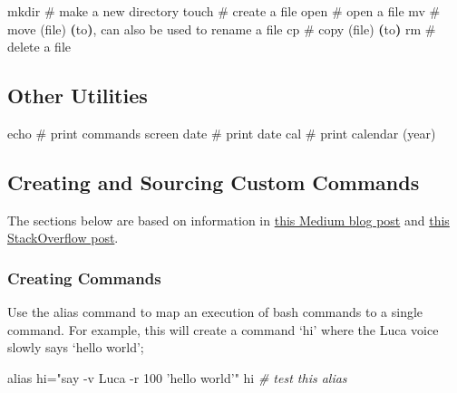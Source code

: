 \documentclass[]{article}
\newenvironment{Shaded}{\begin{snugshade}}{\end{snugshade}}
\newcommand{\KeywordTok}[1]{\textcolor[rgb]{0.13,0.29,0.53}{\textbf{#1}}}
\newcommand{\StringTok}[1]{\textcolor[rgb]{0.31,0.60,0.02}{#1}}
\newcommand{\CommentTok}[1]{\textcolor[rgb]{0.56,0.35,0.01}{\textit{#1}}}
\newcommand{\FunctionTok}[1]{\textcolor[rgb]{0.00,0.00,0.00}{#1}}
\newcommand{\BuiltInTok}[1]{#1}
\newcommand{\ExtensionTok}[1]{#1}
\newcommand{\NormalTok}[1]{#1}
\begin{document}
\begin{Shaded}
\begin{Highlighting}[]
\FunctionTok{mkdir}\NormalTok{    # make a new directory}
\FunctionTok{touch}\NormalTok{    # create a file}
\ExtensionTok{open}\NormalTok{     # open a file}
\FunctionTok{mv}\NormalTok{       # move (file) }\KeywordTok{(}\ExtensionTok{to}\KeywordTok{)}\NormalTok{, }\ExtensionTok{can}\NormalTok{ also be used to rename a file}
\FunctionTok{cp}\NormalTok{       # copy (file) }\KeywordTok{(}\ExtensionTok{to}\KeywordTok{)} 
\FunctionTok{rm}\NormalTok{       # delete a file}
\end{Highlighting}
\end{Shaded}

\subsection{Other Utilities}

\begin{Shaded}
\begin{Highlighting}[]
\BuiltInTok{echo}\NormalTok{    # print commands screen}
\FunctionTok{date}\NormalTok{    # print date}
\FunctionTok{cal}\NormalTok{     # print calendar (year)}
\end{Highlighting}
\end{Shaded}

\subsection{Creating and Sourcing Custom Commands}

The sections below are based on information in
\href{https://medium.com/devnetwork/how-to-create-your-own-custom-terminal-commands-c5008782a78e}{\color{blue} this Medium blog post}
and
\href{https://stackoverflow.com/questions/19662713/where-do-i-find-the-bashrc-file-on-mac}{\color{blue}this StackOverflow post}.

\subsubsection{Creating Commands}

Use the alias command to map an execution of bash commands to a single
command. For example, this will create a command `hi' where the Luca
voice slowly says `hello world';

\begin{Shaded}
\begin{Highlighting}[]
\BuiltInTok{alias}\NormalTok{ hi=}\StringTok{"say -v Luca  -r 100 'hello world'"}
\ExtensionTok{hi} \CommentTok{# test this alias}
\end{Highlighting}
\end{Shaded}
\end{document}
